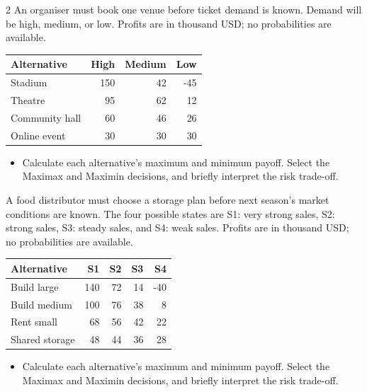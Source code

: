 \begin{multicols}{2}
An organiser must book one venue before ticket demand is known. Demand will be high, medium, or low. Profits are in thousand USD; no probabilities are available.
\begin{center}\small\setlength{\tabcolsep}{4pt}
\begin{tabular}{@{}lrrr@{}}\toprule
Alternative&High&Medium&Low\\\midrule
Stadium&150&42&-45\\
Theatre&95&62&12\\
Community hall&60&46&26\\
Online event&30&30&30\\\bottomrule
\end{tabular}\end{center}
\begin{itemize}\item[\textbf{(C4)}] Calculate each alternative's maximum and minimum payoff. Select the Maximax and Maximin decisions, and briefly interpret the risk trade-off. \end{itemize}
\columnbreak
{}
A food distributor must choose a storage plan before next season's market conditions are known. The four possible states are S1: very strong sales, S2: strong sales, S3: steady sales, and S4: weak sales. Profits are in thousand USD; no probabilities are available.
\begin{center}\small\setlength{\tabcolsep}{4pt}
\begin{tabular}{@{}lrrrr@{}}\toprule
Alternative&S1&S2&S3&S4\\\midrule
Build large&140&72&14&-40\\
Build medium&100&76&38&8\\
Rent small&68&56&42&22\\
Shared storage&48&44&36&28\\\bottomrule
\end{tabular}\end{center}
\begin{itemize}\item[\textbf{(C4)}] Calculate each alternative's maximum and minimum payoff. Select the Maximax and Maximin decisions, and briefly interpret the risk trade-off. \end{itemize}


\end{multicols}
